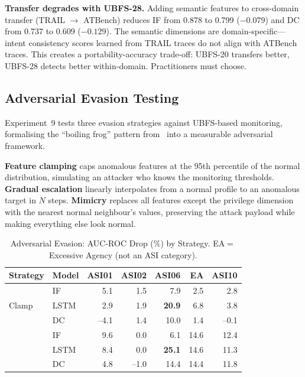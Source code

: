 \documentclass[conference]{IEEEtran}
\begin{document}
\textbf{Transfer degrades with UBFS-28.} Adding semantic features to cross-domain transfer (TRAIL $\to$ ATBench) reduces IF from 0.878 to 0.799 ($-0.079$) and DC from 0.737 to 0.609 ($-0.129$). The semantic dimensions are domain-specific---intent consistency scores learned from TRAIL traces do not align with ATBench traces. This creates a portability-accuracy trade-off: UBFS-20 transfers better, UBFS-28 detects better within-domain. Practitioners must choose.

\subsection{Adversarial Evasion Testing}
\label{sec:evasion}

Experiment~9 tests three evasion strategies against UBFS-based monitoring, formalising the ``boiling frog'' pattern from~\cite{rimal2026insider} into a measurable adversarial framework.

\textbf{Feature clamping} caps anomalous features at the 95th percentile of the normal distribution, simulating an attacker who knows the monitoring thresholds. \textbf{Gradual escalation} linearly interpolates from a normal profile to an anomalous target in $N$ steps. \textbf{Mimicry} replaces all features except the privilege dimension with the nearest normal neighbour's values, preserving the attack payload while making everything else look normal.

\begin{table}[htbp]
\caption{Adversarial Evasion: AUC-ROC Drop (\%) by Strategy. EA${=}$Excessive Agency (not an ASI category).}
\label{tab:evasion}
\centering
\small
\begin{tabular}{@{}llrrrrr@{}}
\toprule
\textbf{Strategy} & \textbf{Model} & \textbf{ASI01} & \textbf{ASI02} & \textbf{ASI06} & \textbf{EA} & \textbf{ASI10} \\
\midrule
\multirow{3}{*}{Clamp}
 & IF   &  5.1 &  1.5 &  7.9 &  2.5 &  2.8 \\
 & LSTM &  2.9 &  1.9 & \textbf{20.9} &  6.8 &  3.8 \\
 & DC   & --4.1 &  1.4 & 10.0 &  1.4 & --0.1 \\
\addlinespace
\multirow{3}{*}{Mimicry}
 & IF   &  9.6 &  0.0 &  6.1 & 14.6 & 12.4 \\
 & LSTM &  8.4 &  0.0 & \textbf{25.1} & 14.6 & 11.3 \\
 & DC   &  4.8 & --1.0 & 14.4 & 14.4 & 11.8 \\
\bottomrule
\end{tabular}
\end{table}
\end{document}
